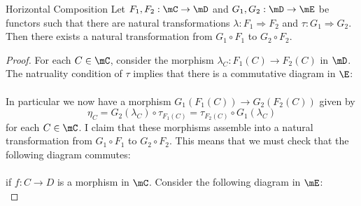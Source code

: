 \documentclass[a4paper]{article}
\begin{document}
\begin{prp}{Horizontal Composition}{} Let $F_1,F_2:\mC\to\mD$ and $G_1,G_2:\mD\to\mE$ be functors such that there are natural transformations $\lambda:F_1\Rightarrow F_2$ and $\tau:G_1\Rightarrow G_2$. Then there exists a natural transformation from $G_1\circ F_1$ to $G_2\circ F_2$. 
\begin{proof}
For each $C\in\mC$, consider the morphism $\lambda_C:F_1(C)\to F_2(C)$ in $\mD$. The natruality condition of $\tau$ implies that there is a commutative diagram in $\E$: \\
\\
In particular we now have a morphism $G_1(F_1(C))\to G_2(F_2(C))$ given by $$\eta_C=G_2(\lambda_C)\circ\tau_{F_1(C)}=\tau_{F_2(C)}\circ G_1(\lambda_C)$$ for each $C\in\mC$. I claim that these morphisms assemble into a natural transformation from $G_1\circ F_1$ to $G_2\circ F_2$. This means that we must check that the following diagram commutes: \\
\\
if $f:C\to D$ is a morphism in $\mC$. Consider the following diagram in $\mE$: \\
\end{proof}
\end{prp}
\end{document}
